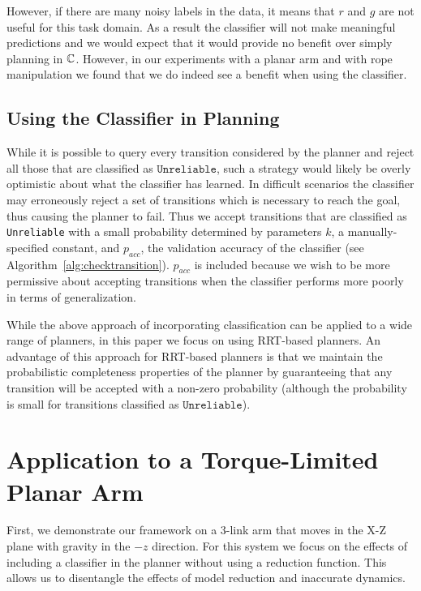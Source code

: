 However, if there are many noisy labels in the data, it means that $r$ and $g$ are not useful for this task domain. As a result the classifier will not make meaningful predictions and we would expect that it would provide no benefit over simply planning in $\mathbb{C}$. However, in our experiments with a planar arm and with rope manipulation we found that we do indeed see a benefit when using the classifier.


\subsection{Using the Classifier in Planning}


While it is possible to query every transition considered by the planner and reject all those that are classified as $\texttt{Unreliable}$, such a strategy would likely be overly optimistic about what the classifier has learned. In difficult scenarios the classifier may erroneously reject a set of transitions which is necessary to reach the goal, thus causing the planner to fail. Thus we accept transitions that are classified as \texttt{Unreliable} with a small probability determined by parameters $k$, a manually-specified constant, and $p_{acc}$, the validation accuracy of the classifier (see  Algorithm~\ref{alg:checktransition}). $p_{acc}$ is included because we wish to be more permissive about accepting transitions when the classifier performs more poorly in terms of generalization.

While the above approach of incorporating classification can be applied to a wide range of planners, in this paper we focus on using RRT-based planners. An advantage of this approach for RRT-based planners is that we maintain the probabilistic completeness properties of the planner by guaranteeing that any transition will be accepted with a non-zero probability (although the probability is small for transitions classified as $\texttt{Unreliable}$).




\section{Application to a Torque-Limited Planar Arm}

First, we demonstrate our framework on a 3-link arm that moves in the X-Z plane with gravity in the $-z$ direction. For this system we focus on the effects of including a classifier in the planner without using a reduction function. This allows us to disentangle the effects of model reduction and inaccurate dynamics. %

